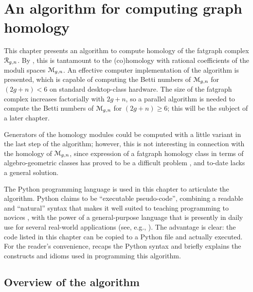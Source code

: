 
\chapter[An algorithm for graph homology]
  {An algorithm for computing graph homology}
\label{chap:algorithm}

This chapter presents an algorithm to compute homology of the fatgraph
complex $\mathcal{R}_{g,n}$.  By , this is
tantamount to the (co)homology with rational coefficients of the
moduli spaces $\mathcal{M}_{g,n}$. An effective computer implementation of the
algorithm is presented, which is capable of computing the Betti
numbers of $\mathcal{M}_{g,n}$ for $(2g+n) < 6$ on standard desktop-class
hardware.  The size of the fatgraph complex increases factorially with
$2g+n$, so a parallel algorithm is needed to compute the Betti numbers
of $\mathcal{M}_{g,n}$ for $(2g+n) \geq 6$; this will be the subject of a later
chapter.

Generators of the homology modules could be computed with a little
variant in the last step of the algorithm; however, this is not
interesting in connection with the homology of $\mathcal{M}_{g,n}$, since
expression of a fatgraph homology class in terms of algebro-geometric
classes has proved to be a difficult problem 
\cite{mondello:2004,
  igusa:combinatorial-miller-morita-mumford-classes-and-witten-cycles,
  igusa:graph-cohomology-and-kontsevich-cycles},
and to-date lacks a general solution.

The Python programming language is used in this chapter to articulate
the algorithm.  Python claims to be ``executable pseudo-code'',
combining a readable and ``natural'' syntax that makes it well suited
to teaching programming to novices \cite{georgatos:python}, with the
power of a general-purpose language that is presently in daily use for
several real-world applications (see, e.g., \cite{python:success}).
The advantage is clear: the code listed in this chapter can be copied
to a Python file and actually executed.  For the reader's convenience,
 recaps the Python syntax and briefly explains the
constructs and idioms used in programming this algorithm.


\section[Overview]{Overview of the algorithm}
\label{sec:overview}

